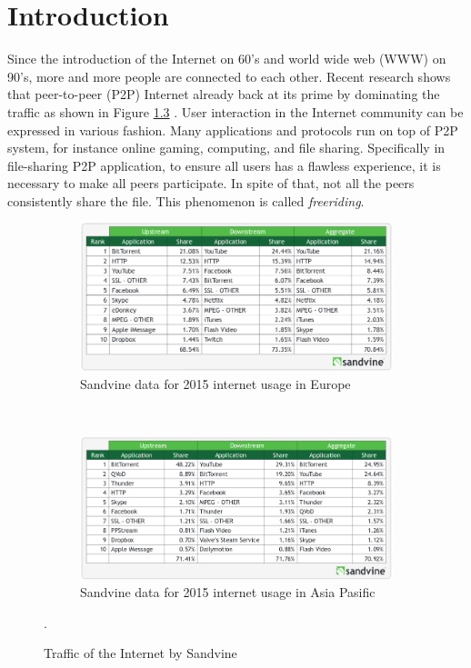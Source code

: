 \chapter{Introduction}
\label{chp:introduction}
Since the introduction of the Internet on 60's and world wide web (WWW) on 90's, more and more people are connected to each other. Recent research shows that peer-to-peer (P2P) Internet already back at its prime by dominating the traffic as shown in Figure \ref{fig:usage} \cite{2015:internettraffic:sandvine}. User interaction in the Internet community can be expressed in various fashion. Many applications and protocols run on top of P2P system, for instance online gaming, computing, and file sharing. Specifically in file-sharing P2P application, to ensure all users has a flawless experience, it is necessary to make all peers participate. In spite of that, not all the peers consistently share the file. This phenomenon is called \textit{freeriding}.

\begin{figure}[h]
	\centering
	\begin{subfigure}[b]{0.8\textwidth}
		\includegraphics[width=\linewidth]{pics/sandvineeu2015}
		\caption{Sandvine data for 2015 internet usage in Europe}
		\label{fig:usage1}
	\end{subfigure}\\
	\begin{subfigure}[b]{0.8\textwidth}
		\includegraphics[width=\linewidth]{pics/sandvineasia2015}
		\caption{Sandvine data for 2015 internet usage in Asia Pasific}
		\label{fig:usage2}
	\end{subfigure}%
	\caption{Traffic of the Internet by Sandvine \cite{2015:internettraffic:sandvine}}.
	\label{fig:usage}
\end{figure}

